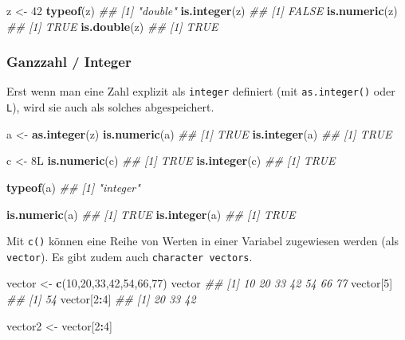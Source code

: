 \documentclass[]{book}
\newenvironment{Shaded}{\begin{snugshade}}{\end{snugshade}}
\newcommand{\CommentTok}[1]{\textcolor[rgb]{0.56,0.35,0.01}{\textit{#1}}}
\newcommand{\DecValTok}[1]{\textcolor[rgb]{0.00,0.00,0.81}{#1}}
\newcommand{\KeywordTok}[1]{\textcolor[rgb]{0.13,0.29,0.53}{\textbf{#1}}}
\newcommand{\NormalTok}[1]{#1}
\newcommand{\OperatorTok}[1]{\textcolor[rgb]{0.81,0.36,0.00}{\textbf{#1}}}
\newcommand{\StringTok}[1]{\textcolor[rgb]{0.31,0.60,0.02}{#1}}
\begin{document}
\begin{Shaded}
\begin{Highlighting}[]
\NormalTok{z <-}\StringTok{ }\DecValTok{42}
\KeywordTok{typeof}\NormalTok{(z)}
\CommentTok{## [1] "double"}
\KeywordTok{is.integer}\NormalTok{(z)}
\CommentTok{## [1] FALSE}
\KeywordTok{is.numeric}\NormalTok{(z)}
\CommentTok{## [1] TRUE}
\KeywordTok{is.double}\NormalTok{(z)}
\CommentTok{## [1] TRUE}
\end{Highlighting}
\end{Shaded}

\hypertarget{ganzzahl-integer}{%
\subsubsection{Ganzzahl / Integer}\label{ganzzahl-integer}}

Erst wenn man eine Zahl explizit als \texttt{integer} definiert (mit \texttt{as.integer()} oder \texttt{L}), wird sie auch als solches abgespeichert.

\begin{Shaded}
\begin{Highlighting}[]
\NormalTok{a <-}\StringTok{ }\KeywordTok{as.integer}\NormalTok{(z)}
\KeywordTok{is.numeric}\NormalTok{(a)}
\CommentTok{## [1] TRUE}
\KeywordTok{is.integer}\NormalTok{(a)}
\CommentTok{## [1] TRUE}

\NormalTok{c <-}\StringTok{ }\NormalTok{8L}
\KeywordTok{is.numeric}\NormalTok{(c)}
\CommentTok{## [1] TRUE}
\KeywordTok{is.integer}\NormalTok{(c)}
\CommentTok{## [1] TRUE}
\end{Highlighting}
\end{Shaded}

\begin{Shaded}
\begin{Highlighting}[]
\KeywordTok{typeof}\NormalTok{(a)}
\CommentTok{## [1] "integer"}

\KeywordTok{is.numeric}\NormalTok{(a)}
\CommentTok{## [1] TRUE}
\KeywordTok{is.integer}\NormalTok{(a)}
\CommentTok{## [1] TRUE}
\end{Highlighting}
\end{Shaded}

Mit \texttt{c()} können eine Reihe von Werten in einer Variabel zugewiesen werden (als \texttt{vector}). Es gibt zudem auch \texttt{character\ vectors}.

\begin{Shaded}
\begin{Highlighting}[]
\NormalTok{vector <-}\StringTok{ }\KeywordTok{c}\NormalTok{(}\DecValTok{10}\NormalTok{,}\DecValTok{20}\NormalTok{,}\DecValTok{33}\NormalTok{,}\DecValTok{42}\NormalTok{,}\DecValTok{54}\NormalTok{,}\DecValTok{66}\NormalTok{,}\DecValTok{77}\NormalTok{)}
\NormalTok{vector}
\CommentTok{## [1] 10 20 33 42 54 66 77}
\NormalTok{vector[}\DecValTok{5}\NormalTok{]}
\CommentTok{## [1] 54}
\NormalTok{vector[}\DecValTok{2}\OperatorTok{:}\DecValTok{4}\NormalTok{]}
\CommentTok{## [1] 20 33 42}

\NormalTok{vector2 <-}\StringTok{ }\NormalTok{vector[}\DecValTok{2}\OperatorTok{:}\DecValTok{4}\NormalTok{]}
\end{Highlighting}
\end{Shaded}
\end{document}
